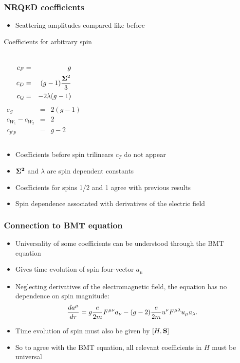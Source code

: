 \documentclass[11ppt]{beamer}
\newcommand{\beqa}{\begin{eqnarray*} }
\newcommand{\eeqa}{\end{eqnarray*} }
\newcommand{\beq}{\begin{equation*} }
\newcommand{\eeq}{\end{equation*} }
\newcommand{\Sitem}[1]{ \begin{itemize} \item #1 \end{itemize} }
\begin{document}
\begin{frame}
\frametitle{NRQED coefficients}



\begin{itemize}
  \item Scattering amplitudes compared like before
\end{itemize}

\begin{block}{Coefficients for arbitrary spin}
\begin{columns}[l]
\column{.5 in}
\beqa
	c_F &=& g \\
	c_D &=&	(g-1) \frac{\v{\Sigma}^2}{3} 	\\
	c_Q &=&	-2 \lambda (g-1)	
\eeqa
\column{1 in}
\beqa
	c_S &=& 2(g-1)	\\
	c_{W_1}- c_{W_2} &=& 2	\\
	c_{p'p}	&=&  g-2	
\eeqa
\end{columns}
\end{block}
\Sitem{Coefficients before spin trilinears $c_T$ do not appear}

\normalsize
\begin{itemize}
 
 \item $\mathbf{\Sigma^2}$ and $\lambda$ are spin dependent constants
 \item Coefficients for spins 1/2 and 1 agree with previous results
 \item Spin dependence associated with derivatives of the electric field
\end{itemize}



\end{frame}


\begin{frame}
\frametitle{Connection to BMT equation}
\begin{itemize}
	\item 	Universality of some coefficients can be understood through the BMT equation
	\item 	Gives time evolution of spin four-vector $a_\mu$
	\item 	Neglecting derivatives of the electromagnetic field, the equation has no dependence on spin magnitude:
	\beq
		\d{a^\mu}{\tau} = 
		g \frac{e }{2m} F^{\mu\nu} a_\nu - (g-2) \frac{e }{2m} u^\nu F^{\mu \lambda} u_\mu a_\lambda.
	\eeq 
	\item Time evolution of spin must also be given by $[H, \mathbf{S}]$
	\item So to agree with the BMT equation, all relevant coefficients in $H$ must be universal
\end{itemize}
\end{frame}
\end{document}
